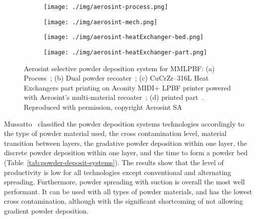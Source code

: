 %
\begin{figure}[!hbtp]
  \centering
  \begin{subfigure}[t]{0.48\textwidth}
  \centering
  \texttt{[image: ./img/aerosint-process.png]}%
  \caption{}%
  \label{fig:aerosint-proc}
  \end{subfigure}
  \begin{subfigure}[t]{0.48\textwidth}
  \centering
  \texttt{[image: ./img/aerosint-mech.png]}%
  \caption{}%
  \label{fig:aerosint-mech}
  \end{subfigure}
%
  \begin{subfigure}[t]{0.48\textwidth}
  \centering
  \texttt{[image: ./img/aerosint-heatExchanger-bed.png]}%
  \caption{}%
  \label{fig:aerosint-heatExchanger-bed}
\end{subfigure}
%
  \begin{subfigure}[t]{0.48\textwidth}
  \centering
  \texttt{[image: ./img/aerosint-heatExchanger-part.png]}%
  \caption{}%
  \label{fig:aerosint-heatExchanger-part}
  \end{subfigure}
%
  \caption[Aerosint selective powder deposition system for MMLPBF]{
    Aerosint selective powder deposition system for MMLPBF: (a) Process~\cite{aerosintPatternDrum2019}; (b) Dual
    powder recoater~\cite{aerosintSite}; (c) CuCrZr--316L Heat Exchangers part printing on Aconity
    MIDI+ LPBF printer powered with Aerosint's multi-material recoater~\cite{aerosintHeatExchanger}; (d)
    printed part~\cite{aerosintSite}. Reproduced with permission, copyright Aerosint SA}%
    \label{fig:aerosint-recoater}
\end{figure}
%

Mussatto~\cite{mussatto2022research} classified the powder deposition systems technologies accordingly to
the type of powder material used, the cross contamination level, material
transition between layers, the gradative powder deposition within one layer, the
discrete powder deposition within one layer, and the time to form a powder bed
(Table~\ref{tab:powder-deposit-systems}). The results show that the level of
productivity is low for all technologies except conventional and alternating
spreading. Furthermore, powder spreading with suction is overall the most well
performant. It can be used with all types of powder materials, and has the
lowest cross contamination, although with the significant shortcoming of not
allowing gradient powder deposition.

